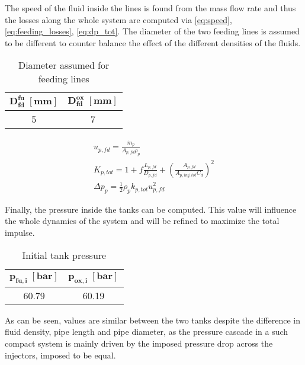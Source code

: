 The speed of the fluid inside the lines is found from the mass flow rate and thus the losses along the whole system are computed via \autoref{eq:speed}, \autoref{eq:feeding_losses}, \autoref{eq:dp_tot}. The diameter of the two feeding lines is assumed to be different to counter balance the effect of the different densities of the fluids.

\begin{table}[H]
    \renewcommand{\arraystretch}{1.5}
    \centering
    \begin{tabular}{|c|c|}
        \hline
        $\boldsymbol{D_{fd}^{fu} \; [\textbf{mm}]}$ & $\boldsymbol{D_{fd}^{ ox} \; [\textbf{mm}]}$ \\
        \hline
        \hline
        5 & 7 \\
        \hline
    \end{tabular}
    \caption{Diameter assumed for feeding lines}
    \label{table:diameter_fd}
\end{table}
\vspace{-1cm}
\begin{gather}
         u_{p,fd} = \frac{\dot{m}_p}{A_{p, fd}\rho_p}
        \label{eq:speed}
        \\
        K_{p, tot} = 1 + f \frac{L_{p,fd}}{D_{p,fd}} + \left(\frac{A_{p, fd}}{A_{p,inj, tot}C_d}\right)^2
       \label{eq:feeding_losses}
       \\
       \Delta p_{p} = \frac{1}{2}\rho_p k_{p, tot} u_{p,fd}^2 
       \label{eq:dp_tot}
\end{gather}

Finally, the pressure inside the tanks can be computed. This value will influence the whole dynamics of the system and will be refined to maximize the total impulse.

\begin{table}[H]
    \renewcommand{\arraystretch}{1.5}
    \centering
    \begin{tabular}{|c|c|}
        \hline
        $\boldsymbol{p_{fu,i}} \; [\textbf{bar}]$ & $\boldsymbol{p_{ox,i}\; [\textbf{bar}]}$ \\
        \hline
        \hline
        60.79 & 60.19 \\
        \hline
    \end{tabular}
    \caption{Initial tank pressure}
    \label{table:tk_press}
\end{table}
As can be seen, values are similar between the two tanks despite the difference in fluid density, pipe length and pipe diameter, as the pressure cascade in a such compact system is mainly driven by the imposed pressure drop across the injectors, imposed to be equal.

